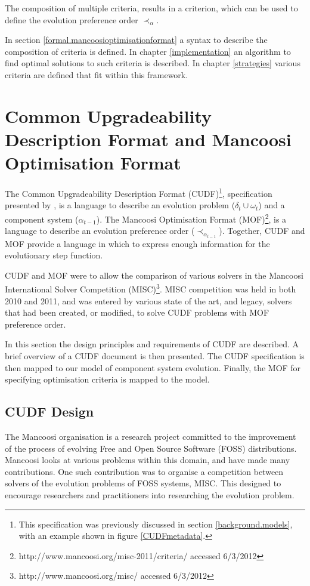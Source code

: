 The composition of multiple criteria, results in a criterion, which can be used to define the evolution preference order $\prec_{\alpha}$.

In section \ref{formal.mancoosioptimisationformat} a syntax to describe the composition of criteria is defined. 
In chapter \ref{implementation} an algorithm to find optimal solutions to such criteria is described.
In chapter \ref{strategies} various criteria are defined that fit within this framework.

\section{Common Upgradeability Description Format and Mancoosi Optimisation Format}
\label{formal.cudf}
The Common Upgradeability Description Format (CUDF)\footnote{This specification was previously discussed in section \ref{background.models}, with an example shown in figure \ref{CUDFmetadata}.
}, 
specification presented by \citep{treinen2009common}, is a language to describe an evolution problem ($\delta_t \cup \omega_t$) and a component system ($\alpha_{t-1}$). 
The Mancoosi Optimisation Format (MOF)\footnote{http://www.mancoosi.org/misc-2011/criteria/ accessed 6/3/2012}, is a language to describe an evolution preference order ($\prec_{\alpha_{t-1}}$).
Together, CUDF and MOF provide a language in which to express enough information for the evolutionary step function.

CUDF and MOF were to allow the comparison of various solvers in the Mancoosi International Solver Competition (MISC)\footnote{http://www.mancoosi.org/misc/ accessed 6/3/2012}.
MISC competition was held in both 2010 and 2011,
and was entered by various state of the art, and legacy, solvers that had been created, or modified, to solve CUDF problems with MOF preference order.

In this section the design principles and requirements of CUDF are described.
A brief overview of a CUDF document is then presented.
The CUDF specification is then mapped to our model of component system evolution.
Finally, the MOF for specifying optimisation criteria is mapped to the model.

\subsection{CUDF Design}
\label{formal.cudfDesign}
The Mancoosi organisation is a research project committed to the improvement of the process of evolving Free and Open Source Software (FOSS) distributions.
Mancoosi looks at various problems within this domain, and have made many contributions.
One such contribution was to organise a competition between solvers of the evolution problems of FOSS systems, MISC.
This designed to encourage researchers and practitioners into researching the evolution problem.

